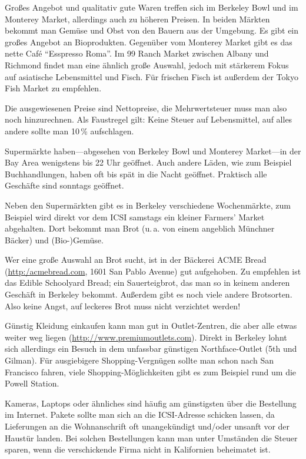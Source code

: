 \documentclass[a4paper]{scrreprt}
\begin{document}
Großes Angebot und qualitativ gute Waren treffen sich im Berkeley Bowl
und im Monterey Market, allerdings auch zu höheren Preisen. In beiden
Märkten bekommt man Gemüse und Obst von den Bauern aus der
Umgebung. Es gibt ein großes Angebot an Bioprodukten. Gegenüber vom
Monterey Market gibt es das nette Café ``Esspresso Roma''. Im 99 Ranch Market zwischen Albany und Richmond findet man eine ähnlich große Auswahl, jedoch mit stärkerem Fokus auf asiatische Lebensmittel und Fisch. Für frischen Fisch ist außerdem der Tokyo Fish Market zu empfehlen.

Die ausgewiesenen Preise sind Nettopreise, die Mehrwertsteuer muss man
also noch hinzurechnen. Als Faustregel gilt: Keine Steuer auf
Lebensmittel, auf alles andere sollte man 10\,\% aufschlagen.

Supermärkte haben---abgesehen von Berkeley Bowl und Monterey Market---in der Bay Area wenigstens bis 22 Uhr geöffnet. Auch
andere Läden, wie zum Beispiel Buchhandlungen, haben oft bis spät in
die Nacht geöffnet. Praktisch alle Geschäfte sind sonntags geöffnet.

Neben den Supermärkten gibt es in Berkeley verschiedene Wochenmärkte,
zum Beispiel wird direkt vor dem ICSI samstags ein kleiner Farmers'
Market abgehalten. Dort bekommt man Brot (u.\,a. von einem angeblich
Münchner Bäcker) und (Bio-)Gemüse. %

Wer eine große Auswahl an Brot sucht, ist in der Bäckerei ACME Bread
(\url{http:/acmebread.com}, 1601 San Pablo Avenue) gut aufgehoben. Zu
empfehlen ist das Edible Schoolyard Bread; ein Sauerteigbrot, das man
so in keinem anderen Geschäft in Berkeley bekommt. Außerdem gibt es
noch viele andere Brotsorten. Also keine Angst, auf
leckeres Brot muss nicht verzichtet werden! 

Günstig Kleidung einkaufen kann man gut in Outlet-Zentren, die aber
alle etwas weiter weg liegen
(\url{http://www.premiumoutlets.com}). Direkt in Berkeley lohnt sich allerdings ein Besuch in dem unfassbar günstigen Northface-Outlet (5th und Gilman). Für ausgiebigere
Shopping-Vergnügen sollte man schon nach San Francisco fahren, viele
Shopping-Möglichkeiten gibt es zum Beispiel rund um die Powell
Station.

Kameras, Laptops oder ähnliches sind häufig am günstigsten über die
Bestellung im Internet. Pakete sollte man sich an die ICSI-Adresse
schicken lassen, da Lieferungen an die Wohnanschrift oft unangekündigt
und/oder unsanft vor der Haustür landen. Bei solchen Bestellungen kann
man unter Umständen die Steuer sparen, wenn die verschickende Firma
nicht in Kalifornien beheimatet ist.
\end{document}
